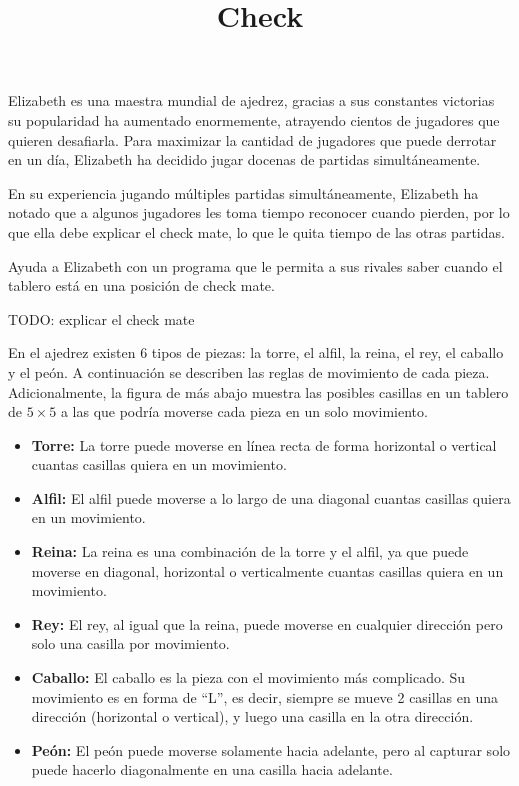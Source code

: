 \documentclass{oci}
\title{Check}
\begin{document}
\begin{problemDescription}
Elizabeth es una maestra mundial de ajedrez, gracias a sus constantes
victorias su popularidad ha aumentado enormemente, atrayendo cientos
de jugadores que quieren desafiarla. Para maximizar la cantidad de
jugadores que puede derrotar en un día, Elizabeth ha decidido jugar
docenas de partidas simultáneamente.

En su experiencia jugando múltiples partidas simultáneamente,
Elizabeth ha notado que a algunos jugadores les toma tiempo reconocer
cuando pierden, por lo que ella debe explicar el check mate, lo que le
quita tiempo de las otras partidas.

Ayuda a Elizabeth con un programa que le permita a sus rivales saber
cuando el tablero está en una posición de check mate.

TODO: explicar el check mate

  En el ajedrez existen 6 tipos de piezas: la torre, el alfil, la reina, el rey, el caballo y el peón.
  A continuación se describen las reglas de movimiento de cada pieza.
  Adicionalmente, la figura de más abajo muestra las posibles casillas en un tablero de $5\times 5$ a las que podría moverse cada pieza en un solo movimiento.
  \begin{itemize}
    \item \textbf{Torre:} La torre puede moverse en línea recta de forma horizontal o vertical cuantas casillas quiera en un movimiento.
    \item \textbf{Alfil:} El alfil puede moverse a lo largo de una diagonal cuantas casillas quiera en un movimiento.
    \item \textbf{Reina:} La reina es una combinación de la torre y el alfil, ya que puede moverse en diagonal, horizontal o verticalmente cuantas casillas quiera en un movimiento.
    \item \textbf{Rey:} El rey, al igual que la reina, puede moverse en cualquier dirección pero solo una casilla por movimiento.
    \item \textbf{Caballo:} El caballo es la pieza con el movimiento más complicado. Su movimiento es en forma de ``L'', es decir, siempre se mueve 2 casillas en una dirección (horizontal o vertical), y luego una casilla en la otra dirección.
    \item \textbf{Peón:} El peón puede moverse solamente hacia adelante, pero al capturar solo puede hacerlo diagonalmente en una casilla hacia adelante.
  \end{itemize}

\end{problemDescription}
\end{document}
